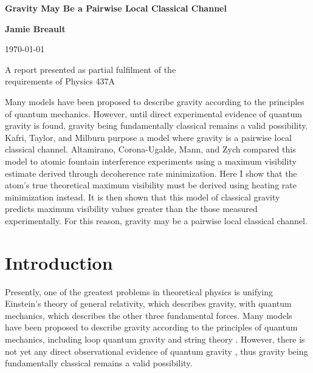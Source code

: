 \documentclass[aps, prd, superscriptaddress,twocolumn,amsmath,amssymb,nofootinbib]{revtex4-1}
\begin{document}
\begin{titlepage}
    \begin{center}
        \vspace*{3cm}
        
       \textbf{\huge Gravity May Be a Pairwise Local Classical Channel}
               
        \vspace{1.5cm}
        \textbf{Jamie Breault}
        
        \today
        
        \vspace{1.5cm}
        A report presented as partial fulfilment of the\\
        requirements of Physics 437A 
        \vspace{3cm}
        \end{center}
        
        Many models have been proposed to describe gravity according to the principles of quantum mechanics. However, until direct experimental evidence of quantum gravity is found, gravity being fundamentally classical remains a valid possibility. Kafri, Taylor, and Milburn purpose a model where gravity is a pairwise local classical channel. Altamirano, Corona-Ugalde, Mann, and Zych compared this model to atomic fountain interference experiments using a maximum visibility estimate derived through decoherence rate minimization. Here I show that the atom's true theoretical maximum visibility must be derived using heating rate minimization instead. It is then shown that this model of classical gravity predicts maximum visibility values greater than the those measured experimentally. For this reason, gravity may be a pairwise local classical channel.
    
    \newpage
\end{titlepage}
\onecolumngrid
{}
\tableofcontents
\makeatletter
\let\toc@pre\relax
\let\toc@post\relax
\makeatother
\newpage
\listoffigures
\newpage
\onecolumngrid
\section{Introduction}
Presently, one of the greatest problems in theoretical physics is unifying Einstein's theory of general relativity, which describes gravity, with quantum mechanics, which describes the other three fundamental forces. Many models have been proposed to describe gravity according to the principles of quantum mechanics, including loop quantum gravity and string theory \cite{PI}. However, there is not yet any direct observational evidence of quantum gravity \cite{no_QG_evidence}, thus gravity being fundamentally classical remains a valid possibility.
\end{document}
